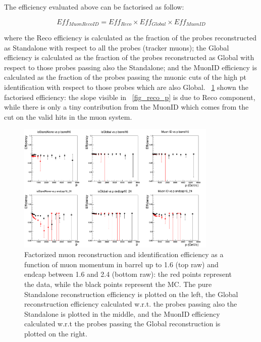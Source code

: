
The efficiency evaluated above can be factorised as follow:

\begin{equation}
Eff_{MuonRecoID} = Eff_{Reco} \times Eff_{Global} \times Eff_{MuonID}
\end{equation} 

where the Reco efficiency is calculated as the fraction of the probes reconstructed as Standalone with respect to all the probes (tracker muons); the Global efficiency is calculated as the fraction of the probes reconstructed as Global with respect to those probes passing also the Standalone; and the MuonID efficiency is calculated as the fraction of the probes passing the muonic cuts of the high pt identification with respect to those probes which are also Global. \figurename~\ref{fig_reco_s} shown the factorised efficiency: the slope visible in \figurename~\ref{fig_reco_p} is due to Reco component, while there is only a tiny contribution from the MuonID which comes from the cut on the valid hits in the muon system. \\

\begin{figure}[htbp]
\centering
\includegraphics[width=0.85\textwidth]{Images/Cap5/Fit_Standalone.png}
\caption{Factorized muon reconstruction and identification efficiency as a function of muon momentum in barrel up to 1.6 (top raw) and endcap between 1.6 and 2.4 (bottom raw): the red points represent the data, while the black points represent the MC. The pure Standalone reconstruction efficiency is plotted on the left, the Global reconstruction efficiency calculated w.r.t. the probes passing also the Standalone is plotted in the middle, and the MuonID efficiency calculated w.r.t the probes passing the Global reconstruction is plotted on the right.}
\label{fig_reco_s}
\end{figure}

